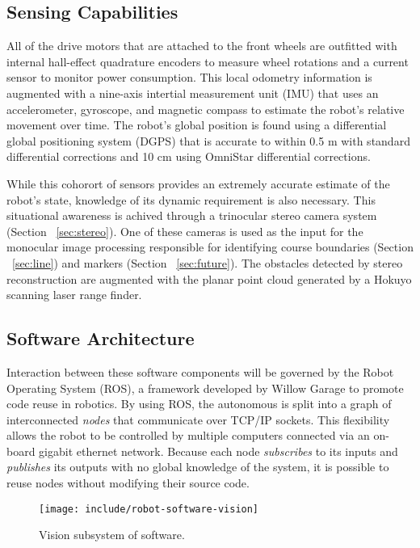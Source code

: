\documentclass[11pt,twocolumn]{article}
\begin{document}
\subsection{Sensing Capabilities}
\label{sec:robot-sensors}
All of the drive motors that are attached to the front wheels are outfitted
with internal hall-effect quadrature encoders to measure wheel rotations and a
current sensor to monitor power consumption. This local odometry information is
augmented with a nine-axis intertial measurement unit (IMU) that uses an
accelerometer, gyroscope, and magnetic compass to estimate the robot's relative
movement over time. The robot's global position is found using a differential
global positioning system (DGPS) that is accurate to within 0.5 m with standard
differential corrections and 10 cm using OmniStar differential corrections.

While this cohorort of sensors provides an extremely accurate estimate of the
robot's state, knowledge of its dynamic requirement is also necessary. This
situational awareness is achived through a trinocular stereo camera system 
(Section ~\ref{sec:stereo}). One of these cameras is used as the input for
the monocular image processing responsible for identifying course boundaries
(Section ~\ref{sec:line}) and markers (Section ~\ref{sec:future}). The obstacles
detected by stereo reconstruction are augmented with the planar point cloud
generated by a Hokuyo scanning laser range finder.


\subsection{Software Architecture}
\label{sec:robot-software}
Interaction between these software components will be governed by the Robot
Operating System (ROS), a framework developed by Willow Garage to promote code
reuse in robotics. By using ROS, the autonomous is split into a graph of
interconnected \textit{nodes} that communicate over TCP/IP sockets. This
flexibility allows the robot to be controlled by multiple computers connected
via an on-board gigabit ethernet network. Because each node \textit{subscribes}
to its inputs and \textit{publishes} its outputs with no global knowledge of
the system, it is possible to reuse nodes without modifying their source code.

\begin{figure}
	\centering
	\texttt{[image: include/robot-software-vision]}
	\caption{Vision subsystem of software.}
	\label{fig:robot-software-vision}
\end{figure}
\end{document}
